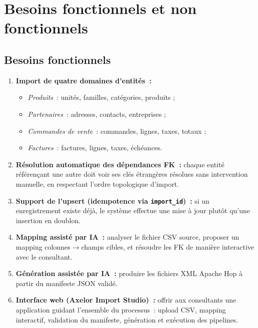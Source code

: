 \section{Besoins fonctionnels et non fonctionnels}

\subsection{Besoins fonctionnels}

\begin{enumerate}
    \item \textbf{Import de quatre domaines d'entités~:}
    \begin{itemize}
        \item \emph{Produits}~: unités, familles, catégories, produits ;
        \item \emph{Partenaires}~: adresses, contacts, entreprises ;
        \item \emph{Commandes de vente}~: commandes, lignes, taxes, totaux ;
        \item \emph{Factures}~: factures, lignes, taxes, échéances.
    \end{itemize}

    \item \textbf{Résolution automatique des dépendances FK~:} chaque entité référençant une autre doit voir ses clés étrangères résolues sans intervention manuelle, en respectant l'ordre topologique d'import.

    \item \textbf{Support de l'upsert (idempotence via \texttt{import\_id})~:} si un enregistrement existe déjà, le système effectue une mise à jour plutôt qu'une insertion en doublon.

    \item \textbf{Mapping assisté par IA~:} analyser le fichier CSV source, proposer un mapping colonnes$\rightarrow$champs cibles, et résoudre les FK de manière interactive avec le consultant.

    \item \textbf{Génération assistée par IA~:} produire les fichiers XML Apache Hop à partir du manifeste JSON validé.

    \item \textbf{Interface web (Axelor Import Studio)~:} offrir aux consultants une application guidant l'ensemble du processus~: upload CSV, mapping interactif, validation du manifeste, génération et exécution des pipelines.
\end{enumerate}

